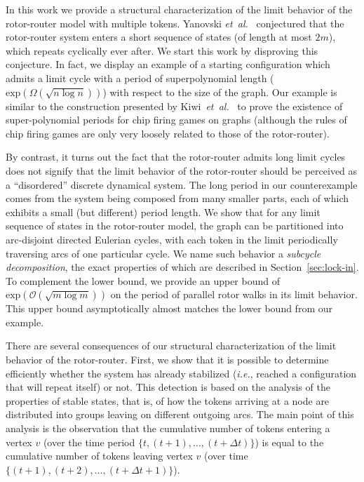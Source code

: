 \documentclass{article}[11pt,letter]
\newcommand{\bigo}{\mathcal{O}}
\newcommand{\ie}{{\it i.e.}\xspace}
\newcommand{\dt}{\Delta t}
\newcommand{\etal}{{\it et~al.}}
\begin{document}
In this work we provide a structural characterization of the limit behavior of the rotor-router model with multiple tokens. Yanovski \etal~\cite{YanovskiWB03} conjectured that the rotor-router system enters a short sequence of states (of length at most $2m$), which repeats cyclically ever after. We start this work by disproving this conjecture. In fact, we display an example of a starting configuration which admits a limit cycle with a period of superpolynomial length ($\text{exp}(\Omega(\sqrt{n \log n}))$) with respect to the size of the graph. Our example is similar to the construction presented by Kiwi~\etal~\cite{Kiwi94nopolynomial} to prove the existence of super-polynomial periods for chip firing games on graphs (although the rules of chip firing games are only very loosely related to those of the rotor-router).

By contrast, it turns out the fact that the rotor-router admits long limit cycles does not signify that the limit behavior of the rotor-router should be perceived as a ``disordered'' discrete dynamical system. The long period in our counterexample comes from the system being composed from many smaller parts, each of which exhibits a small (but different) period length. We show that for any limit sequence of states in the rotor-router model, the graph can be partitioned into arc-disjoint directed Eulerian cycles, with each token in the limit periodically traversing arcs of one particular cycle. We name such behavior a \emph{subcycle decomposition}, the exact properties of which are described in Section~\ref{sec:lock-in}. To complement the lower bound, we provide an upper bound of $\text{exp}(\bigo(\sqrt{m \log m}))$ on the period of parallel rotor walks in its limit behavior. This upper bound asymptotically almost matches the lower bound from our example.

There are several consequences of our structural characterization of the limit behavior of the rotor-router.
First, we show that it is possible to determine efficiently whether the system has already stabilized (\ie, reached a configuration that will repeat itself) or not. This detection is based on the analysis of the properties of stable states, that is, of how the tokens arriving at a node are distributed into groups leaving on different outgoing arcs. The main point of this analysis is the observation that the cumulative number of tokens entering a vertex $v$ (over the time period $\{t,(t+1),\ldots,(t+\dt)\}$) is equal to the cumulative number of tokens leaving vertex $v$ (over time $\{(t+1),(t+2),\ldots,(t+\dt+1)\}$).
\end{document}
